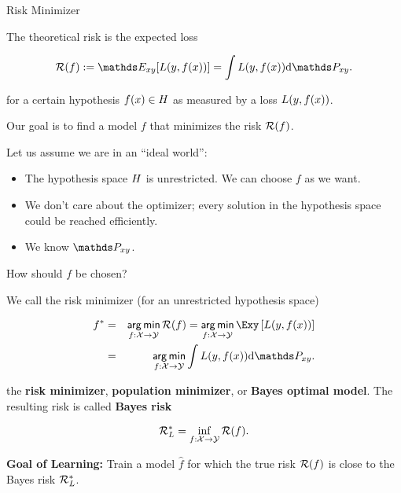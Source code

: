 \begin{vbframe}{Risk Minimizer}

The theoretical risk is the expected loss 

$$ \riskf := \E_{xy} [\Lxy] = \int \Lxy \text{d}\Pxy. $$

for a certain hypothesis $f(x) \in H$ as measured by a loss $L(y, f(x))$. 

\lz 

Our goal is to find a model $f$ that minimizes the risk $\mathcal{R}(f)$.

\lz 

Let us assume we are in an \enquote{ideal world}: 

\begin{itemize}
	\item The hypothesis space $H$ is unrestricted. We can choose $f$ as we want. 
	\item We don't care about the optimizer; every solution in the hypothesis space could be reached efficiently. 
	\item We know $\Pxy$. 
\end{itemize}

How should $f$ be chosen? 

\framebreak 

We call the risk minimizer (for an unrestricted hypothesis space)

\begin{eqnarray*}
	f^\ast &=& \argmin_{f: \Xspace \to \Yspace} \riskf = \argmin_{f: \Xspace \to \Yspace}\Exy\left[\Lxy\right]\\ &=&  \argmin_{f: \Xspace \to \Yspace}\int \Lxy \text{d}\Pxy. 
\end{eqnarray*}

the \textbf{risk minimizer}, \textbf{population minimizer}, or \textbf{Bayes optimal model}. The resulting risk is called \textbf{Bayes risk}

\begin{eqnarray*}
	\mathcal{R}^\ast_{L} = \inf_{f: \mathcal{X} \to \mathcal{Y}} \mathcal{R}(f). 
\end{eqnarray*}

\textbf{Goal of Learning: } Train a model $\hat f$ for which the true risk $\mathcal{R}(f)$ is close to the Bayes risk $\mathcal{R}_L^\ast$. 

\end{vbframe}

